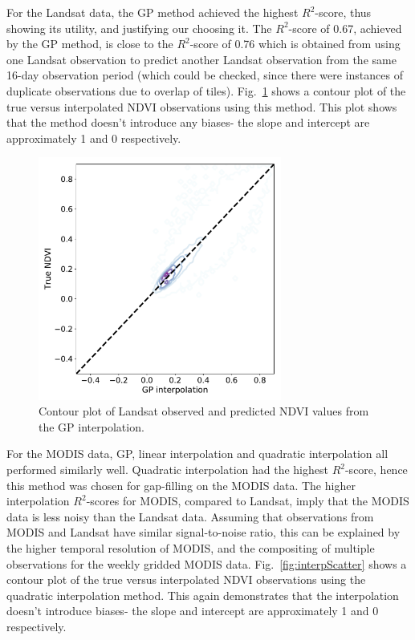 \documentclass[review]{elsarticle}
\begin{document}
For the Landsat data, the GP method achieved the highest $R^2$-score, thus showing its utility, and justifying our choosing it. The $R^2$-score of 0.67, achieved by the GP method, is close to the $R^2$-score of 0.76 which is obtained from using one Landsat observation to predict another Landsat observation from the same 16-day observation period (which could be checked, since there were instances of duplicate observations due to overlap of tiles). Fig.~\ref{fig:interp_GP} shows a contour plot of the true versus interpolated NDVI observations using this method. This plot shows that the method doesn't introduce any biases- the slope and intercept are approximately 1 and 0 respectively.

\begin{figure} 
	\centering
	\includegraphics[trim = 30mm 5mm 5mm 15mm,width=8cm]{figures/interp_GP.pdf}
	\caption{Contour plot of Landsat observed and predicted NDVI values from the GP interpolation.} \label{fig:interp_GP}
\end{figure}





For the MODIS data, GP, linear interpolation and quadratic interpolation all performed similarly well. Quadratic interpolation had the highest $R^2$-score, hence this method was chosen for gap-filling on the MODIS data. The higher interpolation $R^2$-scores for MODIS, compared to Landsat, imply that the MODIS data is less noisy than the Landsat data. Assuming that observations from MODIS and Landsat have similar signal-to-noise ratio, this can be explained by the higher temporal resolution of MODIS, and the compositing of multiple observations for the weekly gridded MODIS data. Fig.~\ref{fig:interpScatter} shows a contour plot of the true versus interpolated NDVI observations using the quadratic interpolation method. This again demonstrates that the interpolation doesn't introduce biases- the slope and intercept are approximately 1 and 0 respectively.
\end{document}
